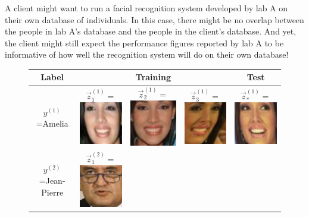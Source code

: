 \documentclass[12pt]{article}
\begin{document}
A client might want to run a facial recognition system
developed by lab A on their own database of individuals.  In this
case, there might be no overlap between the people in lab A's database
and the people in the client's database.  And yet, the client might
still expect the performance figures reported by lab A to be
informative of how well the recognition system will do on their own
database!

\begin{figure}
\centering
\begin{tabular}{|c|ccc|c|}
\hline
Label & & Training & & Test\\ \hline
$y^{(1)}$=Amelia & 
  $\vec{z}_1^{(1)} = $\includegraphics[scale = 0.2]{face_photos/Amelia_Vega_0001.png} &  
  $\vec{z}_2^{(1)} = $\includegraphics[scale = 0.2]{face_photos/Amelia_Vega_0002.png} &  
  $\vec{z}_3^{(1)} = $\includegraphics[scale = 0.2]{face_photos/Amelia_Vega_0003.png} &  
  $\vec{z}_*^{(1)} = $\includegraphics[scale = 0.2]{face_photos/Amelia_Vega_0004.png} \\ \hline
$y^{(2)}$=Jean-Pierre & 
  $\vec{z}_1^{(2)} = $\includegraphics[scale = 0.2]{face_photos/Jean-Pierre_Raffarin_0001.png} &  

\end{tabular}
\end{figure}
\end{document}
